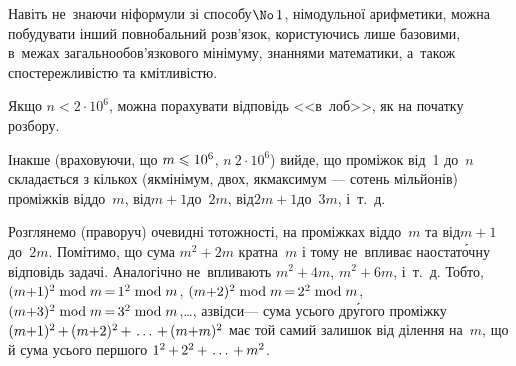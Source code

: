 Навіть не~знаючи ні\nolinebreak[2] формули зі способу\nolinebreak[3] $\No\,1$, ні\nolinebreak[2] модульної арифметики, можна побудувати інший повнобальний розв'язок, користуючись лише базовими, в~межах загальнообов'язкового мінімуму, знаннями математики, а~також спостережливістю та кмітливістю.

Якщо $n < 2{\cdot}10^6$, можна порахувати відповідь <<в~лоб>>, як на початку розбору.

Інакше (враховуючи, що ${m\leqslant10^6}$, $n \> 2{\cdot}10^6$) вийде, що проміжок від~1 до~$n$ складається з кількох (як\nolinebreak[3] мінімум, двох, як\nolinebreak[3] максимум ---  сотень мільйонів) проміжків від\nolinebreak[2] до~$m$, від\nolinebreak[2] ${m{+}1}$\nolinebreak[2] до~$2m$, від\nolinebreak[2] ${2m{+}1}$\nolinebreak[2] до~$3m$, і~т.~д.

\vspace{0.375\baselineskip}


Розглянемо (праворуч) очевидні тотожності, на проміжках від\nolinebreak[2] до~$m$ та від\nolinebreak[2] ${m{+}1}$\nolinebreak[2] до~$2m$. Помітимо, що сума ${m^2{+}2m}$ кратна~$m$ і тому не~впливає на\nolinebreak[3] остат\'{о}чну відповідь задачі.
Аналогічно не~впливають  ${m^2{+}4m}$,  ${m^2{+}6m}$, і~т.~д. Тобто, 
${(m{+}1)^2\bmod m}\dib{{=}}{1^2\bmod m}$,
${(m{+}2)^2\bmod m}\dib{{=}}{2^2\bmod m}$,
${(m{+}3)^2\bmod m}\dib{{=}}{3^2\bmod m}$,\nolinebreak[3] \dots, 
а\nolinebreak[2] звідси\nolinebreak[3] --- сума усього др\'{у}гого проміжку $(m{+}1)^2\dib{{+}}(m{+}2)^2\dib{{+}}\dots\dib{{+}}(m{+}m)^2$ має той самий залишок від ділення на~$m$, що й сума усього першого $1^2\dib{{+}}2^2\dib{{+}}\dots\dib{{+}}m^2$.

